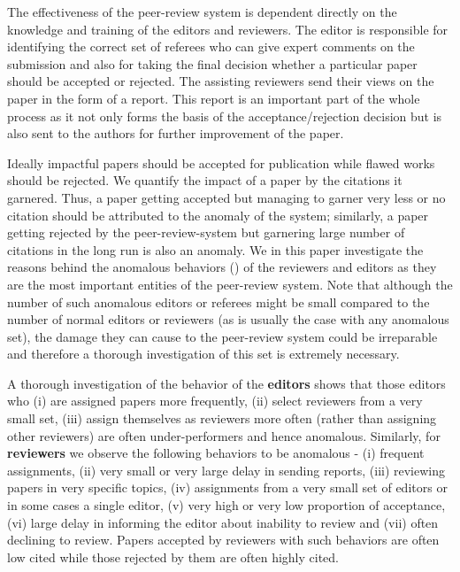  The effectiveness of the peer-review system is dependent directly on the knowledge and training of the editors and reviewers. The editor is responsible for identifying the correct set of referees who can give expert comments on the submission and also for taking the final decision whether a particular paper should be accepted or rejected. The assisting reviewers send their views on the paper in the form of a report. This report is an important part of the whole process as it not only forms the basis of the acceptance/rejection decision but is also sent to the authors for further improvement of the paper.  

Ideally impactful papers should be accepted for publication while flawed works should be rejected. We quantify the impact of a paper by the citations it garnered. Thus, a paper getting accepted but managing to garner very less or no citation should be attributed to the anomaly of the system; similarly, a paper getting rejected by the peer-review-system but garnering large number of citations in the long run is also an anomaly. 
We in this paper investigate the reasons behind the anomalous behaviors (\cite{chandola2009anomaly}) of the reviewers and editors as they are the most important entities of the peer-review system. 
Note that although the number of such anomalous editors or referees might be small compared to the number of normal editors or reviewers  (as is usually the case with any anomalous set), the damage they can cause to the peer-review system could be irreparable and therefore a thorough investigation of this set is extremely necessary. 

 A thorough investigation of the behavior of the {\bf editors} shows that those editors who (i) are assigned papers more frequently, (ii) select reviewers from a very small set, (iii) assign themselves as reviewers more often (rather than assigning other reviewers) are often under-performers and hence anomalous.  
Similarly, for {\bf reviewers} we observe the following behaviors to be anomalous - (i) frequent assignments, (ii) very small or very large delay in sending reports, (iii) reviewing papers in very specific topics, (iv) assignments from a very small set of editors or in some cases a single editor, (v) very high or very low proportion of acceptance,  (vi) large delay in informing the editor about inability to review and (vii) often declining to review. Papers accepted by reviewers with such behaviors are often low cited while those rejected by them are often highly cited.

